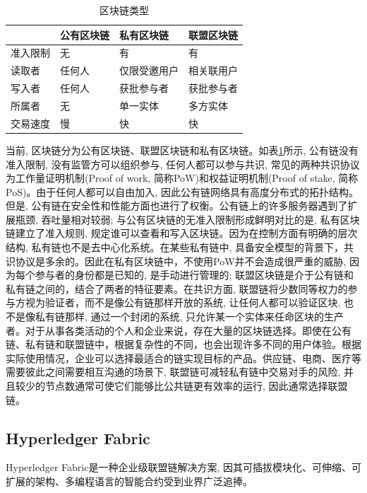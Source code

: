 {\footnotesize
\begin{longtable}[h]{m{70pt} m{70pt} m{70pt} m{70pt}}
    \caption[区块链类型]{区块链类型} \label{blockchain_type} \\
        \toprule   
        &\textbf{公有区块链}&\textbf{私有区块链}&\textbf{联盟区块链}\\
        \hline
        准入限制&无&有&有\\
        
        读取者&任何人&仅限受邀用户&相关联用户\\
        
        写入者&任何人&获批参与者&获批参与者\\
        
        所属者&无&单一实体&多方实体\\
        
        交易速度&慢&快&快\\
        \bottomrule
    \end{longtable}
}

当前, 区块链分为公有区块链、联盟区块链和私有区块链。如表\ref{blockchain_type}所示, 公有链没有准入限制, 没有监管方可以组织参与, 任何人都可以参与共识, 常见的两种共识协议为工作量证明机制(Proof of work, 简称PoW)和权益证明机制(Proof of stake, 简称PoS)。由于任何人都可以自由加入, 因此公有链网络具有高度分布式的拓扑结构。但是, 公有链在安全性和性能方面也进行了权衡。公有链上的许多服务器遇到了扩展瓶颈, 吞吐量相对较弱; 与公有区块链的无准入限制形成鲜明对比的是, 私有区块链建立了准入规则, 规定谁可以查看和写入区块链。因为在控制方面有明确的层次结构, 私有链也不是去中心化系统。在某些私有链中, 具备安全模型的背景下，共识协议是多余的。因此在私有区块链中，不使用PoW并不会造成很严重的威胁, 因为每个参与者的身份都是已知的, 是手动进行管理的; 联盟区块链是介于公有链和私有链之间的，结合了两者的特征要素。在共识方面, 联盟链将少数同等权力的参与方视为验证者，而不是像公有链那样开放的系统, 让任何人都可以验证区块, 也不是像私有链那样, 通过一个封闭的系统, 只允许某一个实体来任命区块的生产者。对于从事各类活动的个人和企业来说，存在大量的区块链选择。即使在公有链、私有链和联盟链中，根据复杂性的不同，也会出现许多不同的用户体验。根据实际使用情况，企业可以选择最适合的链实现目标的产品。供应链、电商、医疗等需要彼此之间需要相互沟通的场景下, 联盟链可减轻私有链中交易对手的风险, 并且较少的节点数通常可使它们能够比公共链更有效率的运行, 因此通常选择联盟链。

\subsection{Hyperledger Fabric}
Hyperledger Fabric\footnotemark[1]是一种企业级联盟链解决方案, 因其可插拔模块化、可伸缩、可扩展的架构、多编程语言的智能合约受到业界广泛追捧。

